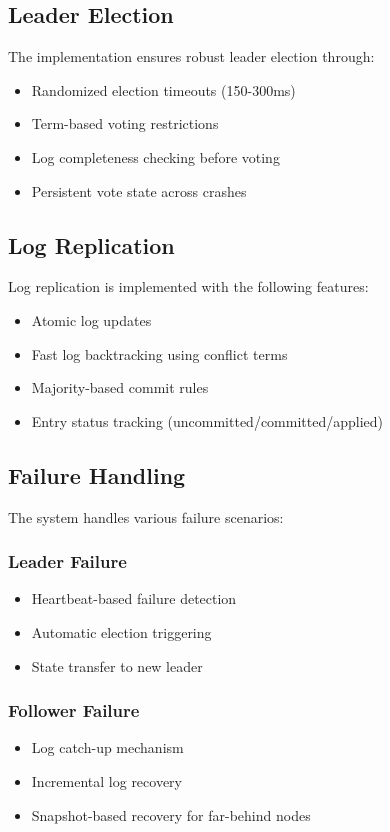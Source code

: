 \documentclass{article}
\begin{document}
\subsection{Leader Election}
The implementation ensures robust leader election through:
\begin{itemize}
    \item Randomized election timeouts (150-300ms)
    \item Term-based voting restrictions
    \item Log completeness checking before voting
    \item Persistent vote state across crashes
\end{itemize}

\subsection{Log Replication}
Log replication is implemented with the following features:
\begin{itemize}
    \item Atomic log updates
    \item Fast log backtracking using conflict terms
    \item Majority-based commit rules
    \item Entry status tracking (uncommitted/committed/applied)
\end{itemize}

\subsection{Failure Handling}
The system handles various failure scenarios:

\subsubsection{Leader Failure}
\begin{itemize}
    \item Heartbeat-based failure detection
    \item Automatic election triggering
    \item State transfer to new leader
\end{itemize}

\subsubsection{Follower Failure}
\begin{itemize}
    \item Log catch-up mechanism
    \item Incremental log recovery
    \item Snapshot-based recovery for far-behind nodes
\end{itemize}
\end{document}
